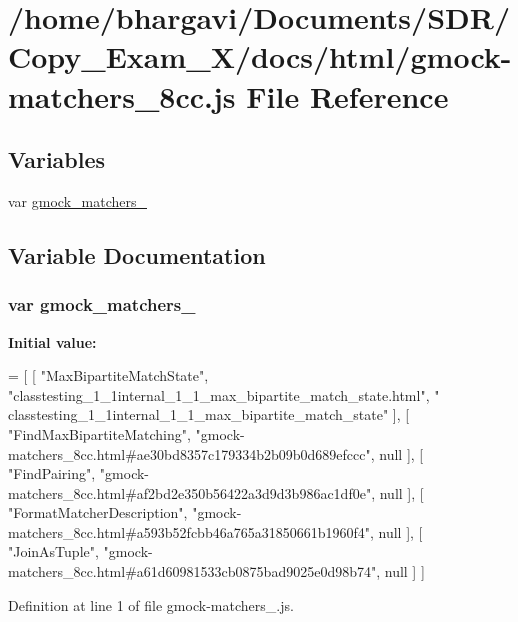 \hypertarget{gmock-matchers__8cc_8js}{}\section{/home/bhargavi/\+Documents/\+S\+D\+R/\+Copy\+\_\+\+Exam\+\_\+X/docs/html/gmock-\/matchers\+\_\+8cc.js File Reference}
\label{gmock-matchers__8cc_8js}
\subsection*{Variables}
\begin{DoxyCompactItemize}
\item 
var \hyperlink{gmock-matchers__8cc_8js_ad2ad6ce8918e939f206c17acc6f57343}{gmock\+\_\+matchers\+\_}
\end{DoxyCompactItemize}


\subsection{Variable Documentation}
\subsubsection[{\texorpdfstring{gmock\+\_\+matchers\+\_\+8cc}{gmock_matchers_8cc}}]{\setlength{\rightskip}{0pt plus 5cm}var gmock\+\_\+matchers\+\_}\hypertarget{gmock-matchers__8cc_8js_ad2ad6ce8918e939f206c17acc6f57343}{}\label{gmock-matchers__8cc_8js_ad2ad6ce8918e939f206c17acc6f57343}
{\bfseries Initial value\+:}
\begin{DoxyCode}
=
[
    [ \textcolor{stringliteral}{"MaxBipartiteMatchState"}, \textcolor{stringliteral}{"classtesting\_1\_1internal\_1\_1\_max\_bipartite\_match\_state.html"}, \textcolor{stringliteral}{"
      classtesting\_1\_1internal\_1\_1\_max\_bipartite\_match\_state"} ],
    [ \textcolor{stringliteral}{"FindMaxBipartiteMatching"}, \textcolor{stringliteral}{"gmock-matchers\_8cc.html#ae30bd8357c179334b2b09b0d689efccc"}, null ],
    [ \textcolor{stringliteral}{"FindPairing"}, \textcolor{stringliteral}{"gmock-matchers\_8cc.html#af2bd2e350b56422a3d9d3b986ac1df0e"}, null ],
    [ \textcolor{stringliteral}{"FormatMatcherDescription"}, \textcolor{stringliteral}{"gmock-matchers\_8cc.html#a593b52fcbb46a765a31850661b1960f4"}, null ],
    [ \textcolor{stringliteral}{"JoinAsTuple"}, \textcolor{stringliteral}{"gmock-matchers\_8cc.html#a61d60981533cb0875bad9025e0d98b74"}, null ]
]
\end{DoxyCode}


Definition at line 1 of file gmock-\/matchers\+\_.\+js.

